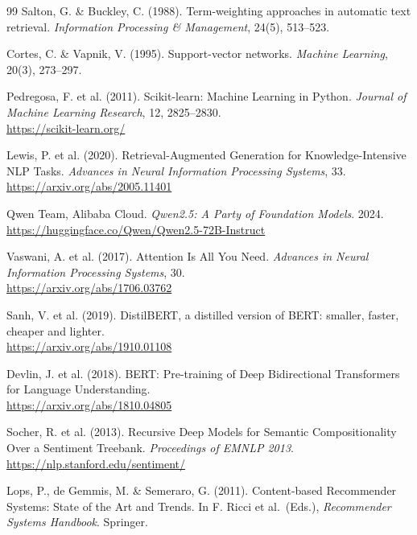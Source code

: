 \documentclass[12pt, a4paper, oneside]{report}
\begin{document}
\begin{thebibliography}{99}
Salton, G. \& Buckley, C. (1988). Term-weighting approaches in automatic text retrieval.
\textit{Information Processing \& Management}, 24(5), 513--523.

Cortes, C. \& Vapnik, V. (1995). Support-vector networks.
\textit{Machine Learning}, 20(3), 273--297.

Pedregosa, F. et al. (2011). Scikit-learn: Machine Learning in Python.
\textit{Journal of Machine Learning Research}, 12, 2825--2830.\\
\url{https://scikit-learn.org/} 

Lewis, P. et al. (2020). Retrieval-Augmented Generation for Knowledge-Intensive NLP Tasks.
\textit{Advances in Neural Information Processing Systems}, 33.\\
\url{https://arxiv.org/abs/2005.11401} 

Qwen Team, Alibaba Cloud. \textit{Qwen2.5: A Party of Foundation Models}. 2024.\\
\url{https://huggingface.co/Qwen/Qwen2.5-72B-Instruct} 

Vaswani, A. et al. (2017). Attention Is All You Need.
\textit{Advances in Neural Information Processing Systems}, 30.\\
\url{https://arxiv.org/abs/1706.03762} 

Sanh, V. et al. (2019). DistilBERT, a distilled version of BERT: smaller, faster, cheaper and lighter.\\
\url{https://arxiv.org/abs/1910.01108} 

Devlin, J. et al. (2018). BERT: Pre-training of Deep Bidirectional Transformers for Language Understanding.\\
\url{https://arxiv.org/abs/1810.04805} 

Socher, R. et al. (2013). Recursive Deep Models for Semantic Compositionality Over a Sentiment Treebank.
\textit{Proceedings of EMNLP 2013}.\\
\url{https://nlp.stanford.edu/sentiment/} 

Lops, P., de Gemmis, M. \& Semeraro, G. (2011). Content-based Recommender Systems: State of the Art and Trends.
In F. Ricci et al.\ (Eds.), \textit{Recommender Systems Handbook}. Springer.


\end{thebibliography}
\end{document}
